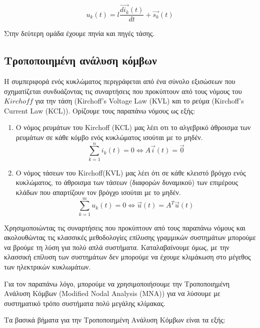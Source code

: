 \begin{equation}
    u_k(t) = l \frac{\overrightarrow{d i_k}(t)}{dt} + \overrightarrow{s_k}(t)
\end{equation}

Στην δεύτερη ομάδα έχουμε πηνία και πηγές τάσης.

\subsection{Τροποποιημένη ανάλυση κόμβων}

Η συμπεριφορά ενός κυκλώματος περιγράφεται από ένα σύνολο εξισώσεων που σχηματίζεται συνδυάζοντας τις συναρτήσεις που προκύπτουν από τους νόμους του $Kirchoff$ για την τάση (\textlatin{Kirchoff's Voltage Law (KVL)} και το ρεύμα (\textlatin{Kirchoff's Current Law (KCL))}. Ορίζουμε τους παραπάνω νόμους ως εξής:

\begin{enumerate}
  \item Ο νόμος ρευμάτων του \textlatin{Kirchoff (KCL)}  μας λέει οτι το αλγεβρικό άθροισμα των ρευμάτων σε κάθε κόμβο ενός κυκλώματος ισούται με το μηδέν.
  \begin{equation}
    \label{4} \sum_{k=1}^{n}i_k(t) = 0 \Leftrightarrow A \overrightarrow{i}(t) = \overrightarrow{0}
  \end{equation}
  \item Ο νόμος τάσεων του \textlatin{Kirchoff(KVL)} μας λέει ότι σε κάθε κλειστό βρόγχο ενός κυκλώματος, το άθροισμα των τάσεων (διαφορών δυναμικού) των επιμέρους κλάδων που απαρτίζουν τον βρόγχο ισούται με το μηδέν.
  \begin{equation}
      \sum_{k=1}^{m}u_k(t) = 0 \Leftrightarrow \overrightarrow{u}(t) = A^T \overrightarrow{u}(t)
  \end{equation}
\end{enumerate}


Χρησιμοποιώντας τις συναρτήσεις που προκύπτουν από τους παραπάνω νόμους και ακολουθώντας τις κλασσικές μεθοδολογίες επίλυσης γραμμικών συστημάτων μπορούμε να βρούμε τη λύση για πολύ απλά συστήματα. Καταλαβαίνουμε όμως, με την κλασσική επίλυση των συστημάτων δεν μπορούμε να έχουμε κλιμάκωση στο μέγεθος των ηλεκτρικών κυκλωμάτων.

Για τον παραπάνω λόγο, μπορούμε να χρησιμοποιήσουμε την Τροποποιημένη Ανάλυση Κόμβων (\textlatin{Modified Nodal Analysis (MNA)}) για να λύσουμε με συστηματικό τρόπο συστήματα πολύ μεγάλης κλίμακας.

Τα βασικά βήματα για την Τροποποιημένη Ανάλυση Κόμβων είναι τα εξής:

